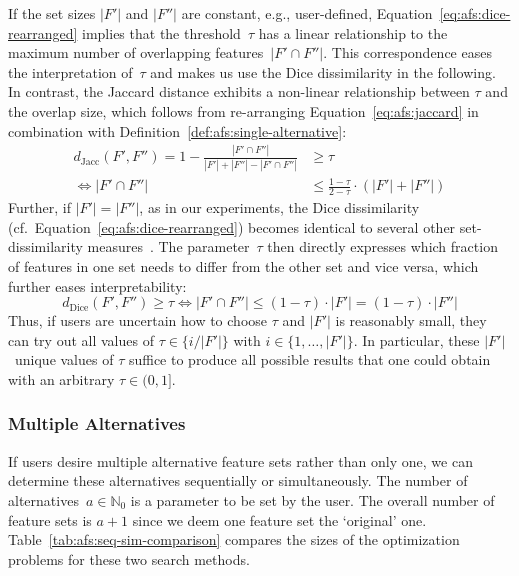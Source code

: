 \documentclass{article}
\theoremstyle{definition}
\begin{document}
If the set sizes $|F'|$ and $|F''|$ are constant, e.g., user-defined, Equation~\ref{eq:afs:dice-rearranged} implies that the threshold~$\tau$ has a linear relationship to the maximum number of overlapping features~$|F' \cap F''|$.
This correspondence eases the interpretation of~$\tau$ and makes us use the Dice dissimilarity in the following.
In contrast, the Jaccard distance exhibits a non-linear relationship between $\tau$ and the overlap size, which follows from re-arranging Equation~\ref{eq:afs:jaccard} in combination with Definition~\ref{def:afs:single-alternative}:
%
\begin{equation}
	\begin{aligned}
		d_{\text{Jacc}}(F',F'') = 1 - \frac{|F' \cap F''|}{|F'| + |F''| - |F' \cap F''|} &\geq \tau \\
		\Leftrightarrow |F' \cap F''| &\leq \frac{1 - \tau}{2 - \tau} \cdot (|F'| + |F''|)
		\end{aligned}
	\label{eq:afs:jaccard-rearranged}
\end{equation}
%
Further, if $|F'| = |F''|$, as in our experiments, the Dice dissimilarity (cf.~Equation~\ref{eq:afs:dice-rearranged}) becomes identical to several other set-dissimilarity measures~\cite{egghe2009new}.
The parameter~$\tau$ then directly expresses which fraction of features in one set needs to differ from the other set and vice versa, which further eases interpretability:
%
\begin{equation}
	d_{\text{Dice}}(F',F'') \geq \tau \Leftrightarrow |F' \cap F''| \leq (1 - \tau) \cdot |F'| = (1 - \tau) \cdot |F''|
	\label{eq:afs:dice-rearranged-equal-size}
\end{equation}
%
Thus, if users are uncertain how to choose $\tau$ and $|F'|$ is reasonably small, they can try out all values of $\tau \in \{i / |F'|\}$ with $i \in \{1, \dots, |F'|\}$.
In particular, these $|F'|$~unique values of $\tau$ suffice to produce all possible results that one could obtain with an arbitrary $\tau \in (0,1]$.

\subsubsection{Multiple Alternatives}
\label{sec:afs:approach:constraints:multiple}

If users desire multiple alternative feature sets rather than only one, we can determine these alternatives sequentially or simultaneously.
The number of alternatives~$a \in \mathbb{N}_0$ is a parameter to be set by the user.
The overall number of feature sets is $a + 1$ since we deem one feature set the `original' one.
Table~\ref{tab:afs:seq-sim-comparison} compares the sizes of the optimization problems for these two search methods.
\end{document}
